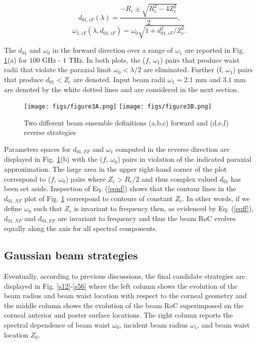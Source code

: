\documentclass{osa-article}
\begin{document}
\begin{equation}\label{eqff}
d_{01,iF}(\lambda)=\frac{-R_c\pm\sqrt{R_c^2-4Z_c^2}}{2},
\end{equation}
\begin{equation}\label{eqnf}
\omega_{1,iF}(\lambda,d_{01,iF})=\omega_0\sqrt{1+d_{01,iF}^2/Z_c^2}.
\end{equation}

The $d_{01}$ and $\omega_0$ in the forward direction over a range of $\omega_1$ are reported in Fig. \ref{limit}(a) for $100$ GHz - $1$ THz. In both plots, the ($f$, $\omega_1$) pairs that produce waist radii that violate the paraxial limit $\omega_0< \lambda/2$ are eliminated. Further (f, $\omega_1$) pairs that produce $d_{01} < Z_c$ are denoted. Input beam radii $\omega_1 = 2.1$ mm and $3.1$ mm are denoted by the white dotted lines and are considered in the next section.

\begin{figure}[t]
\centering
\texttt{[image: figs/figure3A.png]}
\texttt{[image: figs/figure3B.png]}
\caption{Two different beam ensemble definitions (a,b,c) forward and (d,e,f) reverse strategies}\label{limit}
\end{figure}

Parameters spaces for $d_{01,FF}$ and $\omega_1$ computed in the reverse direction are displayed in Fig. \ref{limit}(b) with the ($f$, $\omega_0$) pairs in violation of the indicated paraxial approximation. The large area in the upper right-hand corner of the plot correspond to ($f$, $\omega_0$) pairs where $Z_c>R_c/2$ and thus complex valued $d_{01}$ has been set aside. Inspection of Eq. (\ref{eqnf}) shows that the contour lines in the $d_{01,NF}$ plot of Fig. \ref{limit} correspond to contours of constant $Z_c$. In other words, if we define $\omega_0$ such that $Z_c$ is invariant to frequency then, as evidenced by Eq. (\ref{eqff}), $d_{01,NF}$ and $d_{01,FF}$ are invariant to frequency and thus the beam RoC evolves equally along the axis for all spectral components.

\subsection{Gaussian beam strategies}

Eventually, according to previous discussions, the final candidate strategies are displayed in Fig. \ref{s12}-\ref{s56} where the left column shows the evolution of the beam radius and beam waist location with respect to the corneal geometry and the middle column shows the evolution of the beam RoC superimposed on the corneal anterior and poster surface locations. The right column reports the spectral dependence of beam waist $\omega_0$, incident beam radius $\omega_1$, and beam waist location $Z_0$. 
\end{document}
